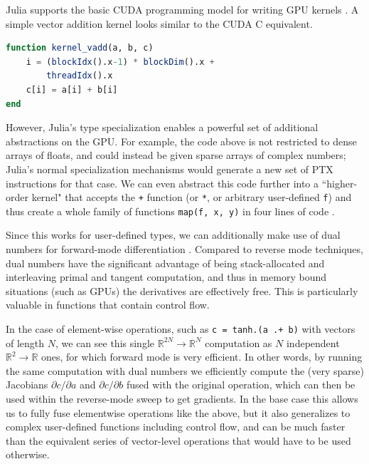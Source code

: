 \documentclass{juliacon}
\begin{document}
Julia supports the basic CUDA programming model for writing GPU kernels \cite{besard2017effective}. A simple vector addition kernel looks similar to the CUDA C equivalent.

\begin{lstlisting}[language = Julia,
                  label={lst:basic_cuda},
                  caption={Basic CUDA programming model expressed in Julia},
                  captionpos=b]
function kernel_vadd(a, b, c)
    i = (blockIdx().x-1) * blockDim().x +
        threadIdx().x
    c[i] = a[i] + b[i]
end
\end{lstlisting}

However, Julia's type specialization enables a powerful set of additional abstractions on the GPU. For example, the code above is not restricted to dense arrays of floats, and could instead be given sparse arrays of complex numbers; Julia's normal specialization mechanisms would generate a new set of PTX instructions for that case. We can even abstract this code further into a ``higher-order kernel" that accepts the \texttt{+} function (or \texttt{*}, or arbitrary user-defined \texttt{f}) and thus create a whole family of functions \texttt{map(f, x, y)} in four lines of code \cite{innesGPU}.

Since this works for user-defined types, we can additionally make use of dual numbers for forward-mode differentiation \cite{revels2016forward}. Compared to reverse mode techniques, dual numbers have the significant advantage of being stack-allocated and interleaving primal and tangent computation, and thus in memory bound situations (such as GPUs) the derivatives are effectively free. This is particularly valuable in functions that contain control flow.

In the case of element-wise operations, such as \texttt{c = tanh.(a .+ b)} with vectors of length $N$, we can see this single $\mathbb{R}^{2N} \rightarrow \mathbb{R}^N$ computation as $N$ independent $\mathbb{R}^2 \rightarrow \mathbb{R}$ ones, for which forward mode is very efficient. In other words, by running the same computation with dual numbers we efficiently compute the (very sparse) Jacobians $\partial c / \partial a$ and $\partial c / \partial b$ fused with the original operation, which can then be used within the reverse-mode sweep to get gradients. In the base case this allows us to fully fuse elementwise operations like the above, but it also generalizes to complex user-defined functions including control flow, and can be much faster than the equivalent series of vector-level operations that would have to be used otherwise.
\end{document}
